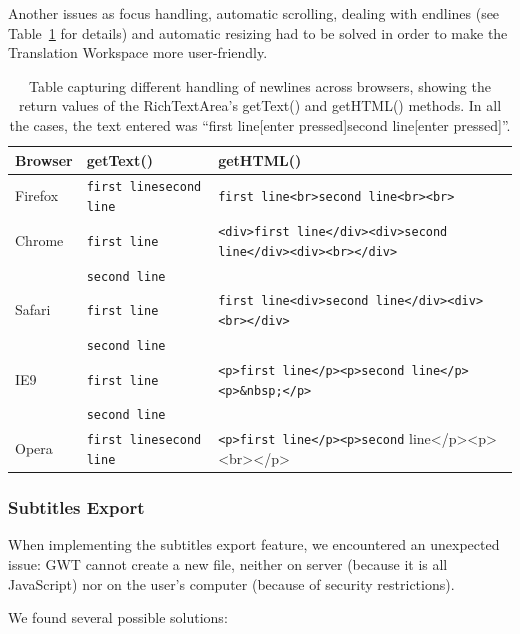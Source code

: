 {Another issues as focus handling, automatic scrolling, dealing with endlines (see Table~\ref{implprocess:RichTextAreaNewlines} for details) and automatic resizing had to be solved in order to make the Translation Workspace more user-friendly.

\begin{table}[h]
\smaller
\begin{center}
\begin{tabular}{|l|l|l|}
\hline
\textbf{Browser} & \textbf{getText()}             & \textbf{getHTML()} \\
\hline
Firefox & \verb=first linesecond line= & \verb=first line<br>second line<br><br>= \\
\hline
Chrome  & \verb=first line=            & \verb=<div>first line</div><div>second line</div><div><br></div>= \\
        & \verb=second line=           & \\ 
\hline
Safari  & \verb=first line=            & \verb=first line<div>second line</div><div><br></div>= \\
        & \verb=second line=           & \\
\hline
IE9     & \verb=first line=            & \verb=<p>first line</p><p>second line</p><p>&nbsp;</p>= \\
        & \verb=second line=           & \\
\hline
Opera   & \verb=first linesecond line= & \verb=<p>first line</p><p>second= line</p><p><br></p> \\
\hline
\end{tabular}
\end{center}
\caption{Table capturing different handling of newlines across browsers, showing the return values of the RichTextArea's getText() and getHTML() methods. In all the cases, the text entered was ``first line[enter pressed]second line[enter pressed]''.}\label{implprocess:RichTextAreaNewlines}
\end{table}

\subsubsection{Subtitles Export}

When implementing the subtitles export feature, we encountered an unexpected issue:
GWT cannot create a new file, neither on server (because it is all JavaScript) nor on the user's computer (because of security restrictions).

We found several possible solutions:

}
